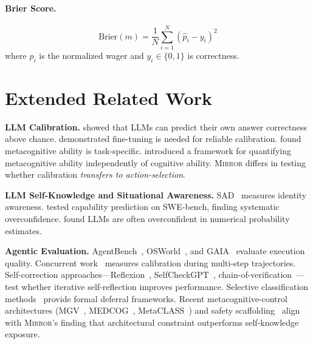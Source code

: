 \documentclass[10pt]{article}
\newcommand{\mirror}{\textsc{Mirror}}
\begin{document}
\paragraph{Brier Score.}
\begin{equation}
\text{Brier}(m) = \frac{1}{N} \sum_{i=1}^{N} (\hat{p}_i - y_i)^2
\end{equation}
where $\hat{p}_i$ is the normalized wager and $y_i \in \{0,1\}$ is correctness.

\section{Extended Related Work}
\label{app:extended-related}

\textbf{LLM Calibration.}
\citet{kadavath2022language} showed that LLMs can predict their own answer correctness above chance. \citet{kapoor2024calibration} demonstrated fine-tuning is needed for reliable calibration. \citet{steyvers2025calibration} found metacognitive ability is task-specific. \citet{wang2025decoupling} introduced a framework for quantifying metacognitive ability independently of cognitive ability. \mirror{} differs in testing whether calibration \textit{transfers to action-selection}.

\textbf{LLM Self-Knowledge and Situational Awareness.}
SAD~\citep{laine2024me} measures identity awareness. \citet{barkan2025llms} tested capability prediction on SWE-bench, finding systematic overconfidence. \citet{xiong2023can} found LLMs are often overconfident in numerical probability estimates.

\textbf{Agentic Evaluation.}
AgentBench~\citep{liu2023agentbench}, OSWorld~\citep{xie2024osworld}, and GAIA~\citep{mialon2023gaia} evaluate execution quality. Concurrent work~\citep{htc2026} measures calibration during multi-step trajectories. Self-correction approaches---Reflexion~\citep{shinn2023reflexion}, SelfCheckGPT~\citep{manakul2023selfcheckgpt}, chain-of-verification~\citep{dhuliawala2023chainofverification}---test whether iterative self-reflection improves performance. Selective classification methods~\citep{geifman2017selective} provide formal deferral frameworks. Recent metacognitive-control architectures (MGV~\citep{oh2025mgv}, MEDCOG~\citep{zhao2026medcog}, MetaCLASS~\citep{liu2026metaclass}) and safety scaffolding~\citep{mosaic2026} align with \mirror{}'s finding that architectural constraint outperforms self-knowledge exposure.
\end{document}
